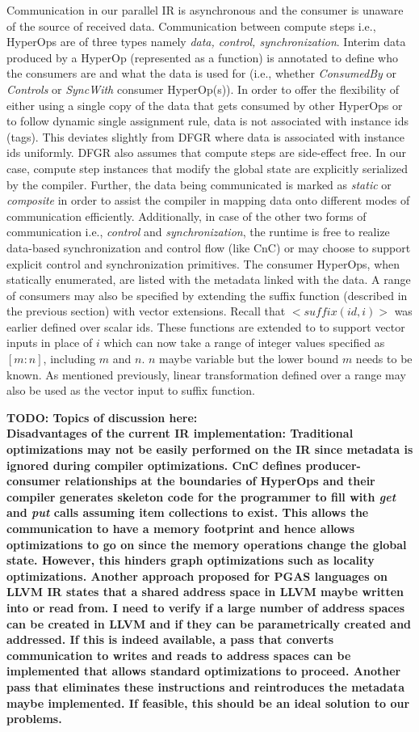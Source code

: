 Communication in our parallel IR is asynchronous and the consumer is unaware of the source of received data. Communication between compute steps i.e., HyperOps are of three types namely \textit{data, control, synchronization}. Interim data produced by a HyperOp (represented as a function) is annotated to define who the consumers are and what the data is used for (i.e., whether \textit{ConsumedBy} or \textit{Controls} or \textit{SyncWith} consumer HyperOp(s)). In order to offer the flexibility of either using a single copy of the data that gets consumed by other HyperOps or to follow dynamic single assignment rule, data is not associated with instance ids (tags). This deviates slightly from DFGR where data is associated with instance ids uniformly. DFGR also assumes that compute steps are side-effect free. In our case, compute step instances that modify the global state are explicitly serialized by the compiler. Further, the data being communicated is marked as \textit{static} or \textit{composite} in order to assist the compiler in mapping data onto different modes of communication efficiently. Additionally, in case of the other two forms of communication i.e., \textit{control} and \textit{synchronization}, the runtime is free to realize data-based synchronization and control flow (like CnC) or may choose to support explicit control and synchronization primitives. The consumer HyperOps, when statically enumerated, are listed with the metadata linked with the data. A range of consumers may also be specified by extending the suffix function (described in the previous section) with vector extensions. Recall that $<suffix(id,i)>$ was earlier defined over scalar ids. These functions are extended to to support vector inputs in place of $i$ which can now take a range of integer values specified as $[m:n]$, including $m$ and $n$. $n$ maybe variable but the lower bound $m$ needs to be known. As mentioned previously, linear transformation defined over a range may also be used as the vector input to suffix function.

\textbf{TODO: Topics of discussion here:\\
Disadvantages of the current IR implementation: Traditional optimizations may not be easily performed on the IR since metadata is ignored during compiler optimizations. CnC defines producer-consumer relationships at the boundaries of HyperOps and their compiler generates skeleton code for the programmer to fill with \textit{get} and \textit{put} calls assuming item collections to exist. This allows the communication to have a memory footprint and hence allows optimizations to go on since the memory operations change the global state. However, this hinders graph optimizations such as locality optimizations. Another approach proposed for PGAS languages on LLVM IR states that a shared address space in LLVM maybe written into or read from. I need to verify if a large number of address spaces can be created in LLVM and if they can be parametrically created and addressed. If this is indeed available, a pass that converts communication to writes and reads to address spaces can be implemented that allows standard optimizations to proceed. Another pass that eliminates these instructions and reintroduces the metadata maybe implemented. If feasible, this should be an ideal solution to our problems.}